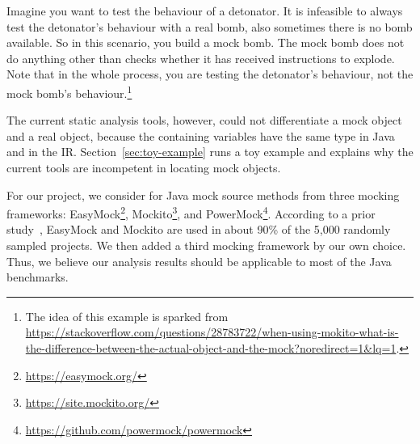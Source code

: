 Imagine you want to test the behaviour of a detonator. It is infeasible to always test the detonator's behaviour with a real bomb, also sometimes there is no bomb available. So in this scenario, you build a mock bomb. The mock bomb does not do anything other than checks whether it has received instructions to explode. Note that in the whole process, you are testing the detonator's behaviour, not the mock bomb's behaviour.\footnote{The idea of this example is sparked from \url{https://stackoverflow.com/questions/28783722/when-using-mokito-what-is-the-difference-between-the-actual-object-and-the-mock?noredirect=1&lq=1}.}

The current static analysis tools, however, could not differentiate a mock object and a real object, because the containing variables have the same type in Java and in the IR. Section~\ref{sec:toy-example} runs a toy example and explains why the current tools are incompetent in locating mock objects.

For our project, we consider for Java mock source methods from three mocking frameworks: EasyMock\footnote{\url{https://easymock.org/}}, Mockito\footnote{\url{https://site.mockito.org/}}, and PowerMock\footnote{\url{https://github.com/powermock/powermock}}. According to a prior study~\cite{mostafa14:_empirical_study_mock_frameworks}, EasyMock and Mockito are used in about 90\% of the 5,000 randomly sampled projects. We then added a third mocking framework by our own choice. Thus, we believe our analysis results should be applicable to most of the Java benchmarks. 